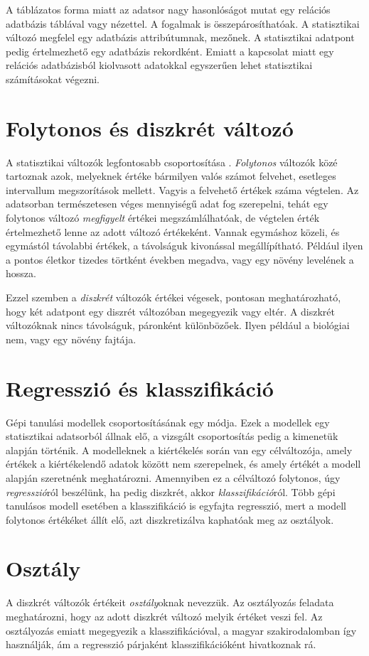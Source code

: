 A táblázatos forma miatt az adatsor nagy hasonlóságot mutat egy relációs adatbázis táblával vagy nézettel. A fogalmak is összepárosíthatóak. A statisztikai változó megfelel egy adatbázis attribútumnak, mezőnek. A statisztikai adatpont pedig értelmezhető egy adatbázis rekordként. Emiatt a kapcsolat miatt egy relációs adatbázisból kiolvasott adatokkal egyszerűen lehet statisztikai számításokat végezni.

\section{Folytonos és diszkrét változó}
A statisztikai változók legfontosabb csoportosítása \cite{statokosvaltozok}. \emph{Folytonos} változók közé tartoznak azok, melyeknek értéke bármilyen valós számot felvehet, esetleges intervallum megszorítások mellett. Vagyis a felvehető értékek száma végtelen. Az adatsorban természetesen véges mennyiségű adat fog szerepelni, tehát egy folytonos változó \emph{megfigyelt} értékei megszámlálhatóak, de végtelen érték értelmezhető lenne az adott változó értékeként. Vannak egymáshoz közeli, és egymástól távolabbi értékek, a távolságuk kivonással megállípítható. Például ilyen a pontos életkor tizedes törtként években megadva, vagy egy növény levelének a hossza.

Ezzel szemben a \emph{diszkrét} változók értékei végesek, pontosan meghatározható, hogy két adatpont egy diszrét változóban megegyezik vagy eltér. A diszkrét változóknak nincs távolságuk, páronként különbözőek. Ilyen például a biológiai nem, vagy egy növény fajtája.

\section{Regresszió és klasszifikáció}
Gépi tanulási modellek csoportosításának egy módja. Ezek a modellek egy statisztikai adatsorból állnak elő, a vizsgált csoportosítás pedig a kimenetük alapján történik. A modelleknek a kiértékelés során van egy célváltozója, amely értékek a kiértékelendő adatok között nem szerepelnek, és amely értékét a modell alapján szeretnénk meghatározni. Amennyiben ez a célváltozó folytonos, úgy \emph{regresszió}ról beszélünk, ha pedig diszkrét, akkor \emph{klasszifikáció}ról. Több gépi tanulásos modell esetében a klasszifikáció is egyfajta regresszió, mert a modell folytonos értékéket állít elő, azt diszkretizálva kaphatóak meg az osztályok.

\section{Osztály}
A diszkrét változók értékeit \emph{osztály}oknak nevezzük. Az osztályozás feladata meghatározni, hogy az adott diszkrét változó melyik értéket veszi fel. Az osztályozás emiatt megegyezik a klasszifikációval, a magyar szakirodalomban így használják, ám a regresszió párjaként klasszifikációként hivatkoznak rá.


